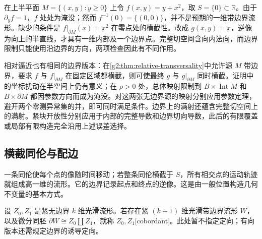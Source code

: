 \begin{example}\label{g2:exm:boundary-transversality-failure}
	在上半平面 \(M=\{(x,y):y\ge0\}\) 上令 \(f(x,y)=y+x^2\)，取 \(S=\{0\}\subset\mathbb R\)。由于 \(\partial_y f=1\)，\(f\) 处处为淹没；然而 \(f^{-1}(0)=\{(0,0)\}\)，并不是预期的一维带边界流形。缺少的条件是 \(f|_{\partial M}(x)=x^2\) 在零点处的横截性。改成 \(g(x,y)=x\)，逆像为向上的半直线，才具有一维内部及一个边界点。完整切空间含向内法向，而边界限制只能使用沿边界的方向，两项检查因此有不同作用。
\end{example}

相对逼近也有相同的边界版本：在\cref{g2:thm:relative-transversality}中允许源 \(M\) 带边界，要求 \(f\) 与 \(f|_{\partial M}\) 在固定区域都横截，则可使最终 \(g\) 与 \(g|_{\partial M}\) 同时横截。证明中的坐标扰动在半空间上仍有意义；在 \(\rho>0\) 处，总体映射限制到 \(B\times\operatorname{Int}M\) 和 \(B\times\partial M\) 都因参数方向而成为淹没。对这两张无边界源的映射分别应用参数定理，避开两个零测异常集的并，即可同时满足条件。边界上的满射还蕴含完整切空间上的满射。紧块开放性分别应用于内部的完整导数和边界切向导数，此后的有限覆盖或局部有限构造完全沿用上述误差选择。

\subsection{横截同伦与配边}
\label{g2:subsec:1404:04}

一条同伦使每个点的像随时间移动；若整条同伦横截于 \(S\)，所有相交点的运动轨迹就组成高一维的流形。它的边界记录起点和终点的逆像。这是由一般位置构造几何不变量的基本方式。

\begin{definition}[配边]\label{g2:def:unoriented-cobordism}
	设 \(Z_0,Z_1\) 是紧无边界 \(k\) 维光滑流形。若存在紧 \((k+1)\) 维光滑带边界流形 \(W\)，以及微分同胚 \(\partial W\cong Z_0\amalg Z_1\)，就称 \(Z_0,Z_1\)[cobordant]。此处暂不指定定向；有向版本还需规定边界的诱导定向。
\end{definition}

